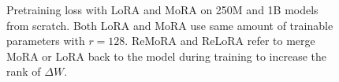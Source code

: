\documentclass[11pt]{article}
\begin{document}
%
\begin{figure}[t]
    \centering
    \caption{
      Pretraining loss with LoRA and MoRA on 250M and 1B models from scratch.
      Both LoRA and MoRA use same amount of trainable parameters with $r=128$.
      ReMoRA and ReLoRA refer to merge MoRA or LoRA back to the model during training to increase the rank of $\Delta W$.
      }
    \label{fig:pretrain_loss}
\end{figure}
\end{document}

